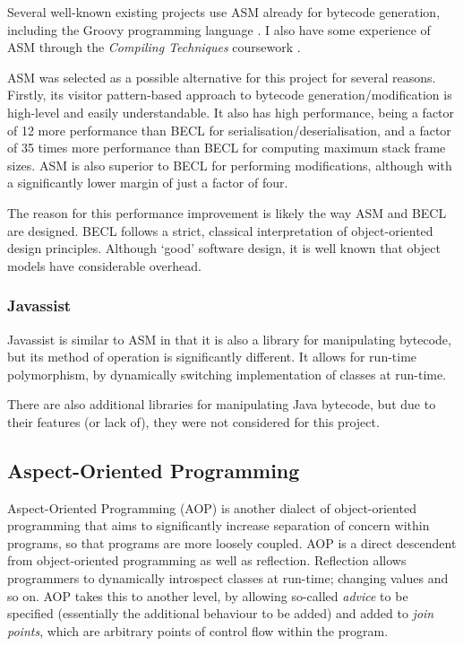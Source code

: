                 Several well-known existing projects use ASM already for bytecode generation, including the Groovy programming language \citep{GroovyDocs}. I also have some experience of ASM through the \textit{Compiling Techniques} coursework \citep{CTcoursework}.

                ASM was selected as a possible alternative for this project for several reasons. Firstly, its visitor pattern-based approach to bytecode generation/modification is high-level and easily understandable. It also has high performance, being a factor of 12 more performance than BECL for serialisation/deserialisation, and a factor of 35 times more performance than BECL for computing maximum stack frame sizes. ASM is also superior to BECL for performing modifications, although with a significantly lower margin of just a factor of four.

                The reason for this performance improvement is likely the way ASM and BECL are designed. BECL follows a strict, classical interpretation of object-oriented design principles. Although `good' software design, it is well known that object models have considerable overhead.

                \subsubsection{Javassist} \label{sec:instrumentation/alt-instr/bytecode-instr/javassist}
                Javassist \citep{Chiba1998} is similar to ASM in that it is also a library for manipulating bytecode, but its method of operation is significantly different. It allows for run-time polymorphism, by dynamically switching implementation of classes at run-time.

                There are also additional libraries for manipulating Java bytecode, but due to their features (or lack of), they were not considered for this project.

        \subsection{Aspect-Oriented Programming} \label{sec:instrumentation/alt-instr/aop}
        Aspect-Oriented Programming (AOP) \citep{Kiczales1997} is another dialect of object-oriented programming that aims to significantly increase separation of concern within programs, so that programs are more loosely coupled. AOP is a direct descendent from object-oriented programming as well as reflection. Reflection allows programmers to dynamically introspect classes at run-time; changing values and so on. AOP takes this to another level, by allowing so-called \textit{advice} to be specified (essentially the additional behaviour to be added) and added to \textit{join points}, which are arbitrary points of control flow within the program.

